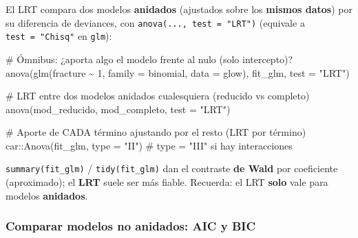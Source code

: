 \documentclass[
  letterpaper,
  DIV=11,
  numbers=noendperiod]{scrartcl}
\newenvironment{Shaded}{\begin{snugshade}}{\end{snugshade}}
\newcommand{\AttributeTok}[1]{\textcolor[rgb]{0.40,0.45,0.13}{#1}}
\newcommand{\CommentTok}[1]{\textcolor[rgb]{0.37,0.37,0.37}{#1}}
\newcommand{\DecValTok}[1]{\textcolor[rgb]{0.68,0.00,0.00}{#1}}
\newcommand{\FunctionTok}[1]{\textcolor[rgb]{0.28,0.35,0.67}{#1}}
\newcommand{\NormalTok}[1]{\textcolor[rgb]{0.00,0.23,0.31}{#1}}
\newcommand{\SpecialCharTok}[1]{\textcolor[rgb]{0.37,0.37,0.37}{#1}}
\newcommand{\StringTok}[1]{\textcolor[rgb]{0.13,0.47,0.30}{#1}}
\begin{document}
\begin{tcolorbox}[enhanced jigsaw, coltitle=black, rightrule=.15mm, arc=.35mm, leftrule=.75mm, colback=white, colbacktitle=quarto-callout-tip-color!10!white, left=2mm, breakable, toptitle=1mm, toprule=.15mm, bottomtitle=1mm, titlerule=0mm, title=\textcolor{quarto-callout-tip-color}{\faLightbulb}\hspace{0.5em}{🔧 En R. Contrastes de razón de verosimilitudes (LRT)}, bottomrule=.15mm, opacityback=0, opacitybacktitle=0.6, colframe=quarto-callout-tip-color-frame]

El LRT compara dos modelos \textbf{anidados} (ajustados sobre los
\textbf{mismos datos}) por su diferencia de deviances, con
\texttt{anova(...,\ test\ =\ "LRT")} (equivale a
\texttt{test\ =\ "Chisq"} en \texttt{glm}):

\begin{Shaded}
\begin{Highlighting}[]
\CommentTok{\# Ómnibus: ¿aporta algo el modelo frente al nulo (solo intercepto)?}
\FunctionTok{anova}\NormalTok{(}\FunctionTok{glm}\NormalTok{(fracture }\SpecialCharTok{\textasciitilde{}} \DecValTok{1}\NormalTok{, }\AttributeTok{family =}\NormalTok{ binomial, }\AttributeTok{data =}\NormalTok{ glow), fit\_glm, }\AttributeTok{test =} \StringTok{"LRT"}\NormalTok{)}

\CommentTok{\# LRT entre dos modelos anidados cualesquiera (reducido vs completo)}
\FunctionTok{anova}\NormalTok{(mod\_reducido, mod\_completo, }\AttributeTok{test =} \StringTok{"LRT"}\NormalTok{)}

\CommentTok{\# Aporte de CADA término ajustando por el resto (LRT por término)}
\NormalTok{car}\SpecialCharTok{::}\FunctionTok{Anova}\NormalTok{(fit\_glm, }\AttributeTok{type =} \StringTok{"II"}\NormalTok{)     }\CommentTok{\# type = "III" si hay interacciones}
\end{Highlighting}
\end{Shaded}

\texttt{summary(fit\_glm)} / \texttt{tidy(fit\_glm)} dan el contraste
\textbf{de Wald} por coeficiente (aproximado); el \textbf{LRT} suele ser
más fiable. Recuerda: el LRT \textbf{solo} vale para modelos
\textbf{anidados}.

\end{tcolorbox}

\hypertarget{comparar-modelos-no-anidados-aic-y-bic}{%
\subsubsection{Comparar modelos no anidados: AIC y
BIC}\label{comparar-modelos-no-anidados-aic-y-bic}}
\end{document}
